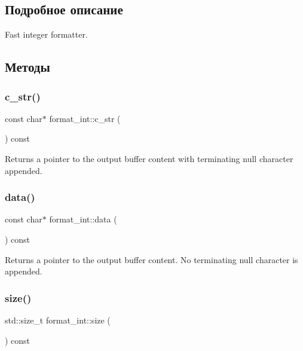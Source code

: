 \subsection{Подробное описание}
Fast integer formatter. 

\subsection{Методы}
\mbox{\label{classformat__int_a0ae1671f3ddacb00738133f29549b724}} 
\subsubsection{\texorpdfstring{c\+\_\+str()}{c\_str()}}
{\footnotesize\ttfamily const char$\ast$ format\+\_\+int\+::c\+\_\+str (\begin{DoxyParamCaption}{ }\end{DoxyParamCaption}) const\hspace{0.3cm}{\ttfamily [inline]}}

Returns a pointer to the output buffer content with terminating null character appended. \mbox{\label{classformat__int_a4ecc95eeed01911d1e2dcc4fabc5df5a}} 
\subsubsection{\texorpdfstring{data()}{data()}}
{\footnotesize\ttfamily const char$\ast$ format\+\_\+int\+::data (\begin{DoxyParamCaption}{ }\end{DoxyParamCaption}) const\hspace{0.3cm}{\ttfamily [inline]}}

Returns a pointer to the output buffer content. No terminating null character is appended. \mbox{\label{classformat__int_a644fe6f2d0505d48ff08ab22448b5069}} 
\subsubsection{\texorpdfstring{size()}{size()}}
{\footnotesize\ttfamily std\+::size\+\_\+t format\+\_\+int\+::size (\begin{DoxyParamCaption}{ }\end{DoxyParamCaption}) const\hspace{0.3cm}{\ttfamily [inline]}}

